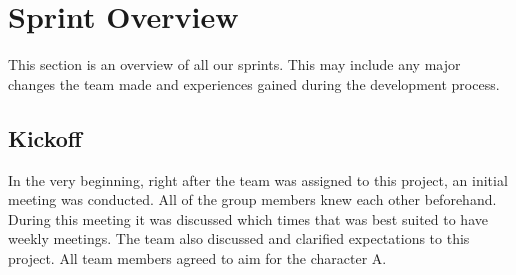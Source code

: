 \section{Sprint Overview}
\label{sec:sprintOverview}
This section is an overview of all our sprints. This may include any major changes the team made and experiences gained during the development process. 

\subsection{Kickoff}
In the very beginning, right after the team was assigned to this project, an initial meeting was conducted. All of the group members knew each other beforehand. During this meeting it was discussed which times that was best suited to have weekly meetings. The team also discussed and clarified expectations to this project. All team members agreed to aim for the character A.






